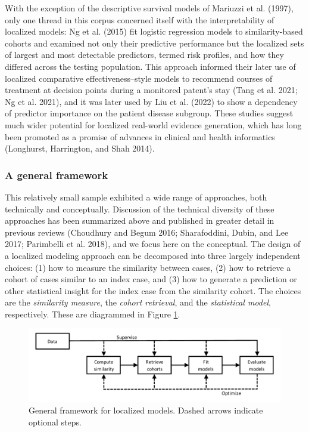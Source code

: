 \documentclass{article}
\begin{document}
With the exception of the descriptive survival models of Mariuzzi et al.
(1997), only one thread in this corpus concerned itself with the
interpretability of localized models: Ng et al. (2015) fit logistic
regression models to similarity-based cohorts and examined not only
their predictive performance but the localized sets of largest and most
detectable predictors, termed risk profiles, and how they differed
across the testing population. This approach informed their later use of
localized comparative effectiveness--style models to recommend courses
of treatment at decision points during a monitored patent's stay (Tang
et al. 2021; Ng et al. 2021), and it was later used by Liu et al. (2022)
to show a dependency of predictor importance on the patient disease
subgroup. These studies suggest much wider potential for localized
real-world evidence generation, which has long been promoted as a
promise of advances in clinical and health informatics (Longhurst,
Harrington, and Shah 2014).

\hypertarget{a-general-framework}{%
\subsubsection{A general framework}\label{a-general-framework}}

This relatively small sample exhibited a wide range of approaches, both
technically and conceptually. Discussion of the technical diversity of
these approaches has been summarized above and published in greater
detail in previous reviews (Choudhury and Begum 2016; Sharafoddini,
Dubin, and Lee 2017; Parimbelli et al. 2018), and we focus here on the
conceptual. The design of a localized modeling approach can be
decomposed into three largely independent choices: (1) how to measure
the similarity between cases, (2) how to retrieve a cohort of cases
similar to an index case, and (3) how to generate a prediction or other
statistical insight for the index case from the similarity cohort. The
choices are the \emph{similarity measure}, the \emph{cohort retrieval},
and the \emph{statistical model}, respectively. These are diagrammed in
Figure \ref{fig:framework}.

\begin{figure}

{\centering \includegraphics[width=1\linewidth]{Fig5} 

}

\caption{General framework for localized models. Dashed arrows indicate optional steps.}\label{fig:framework}
\end{figure}
\end{document}
